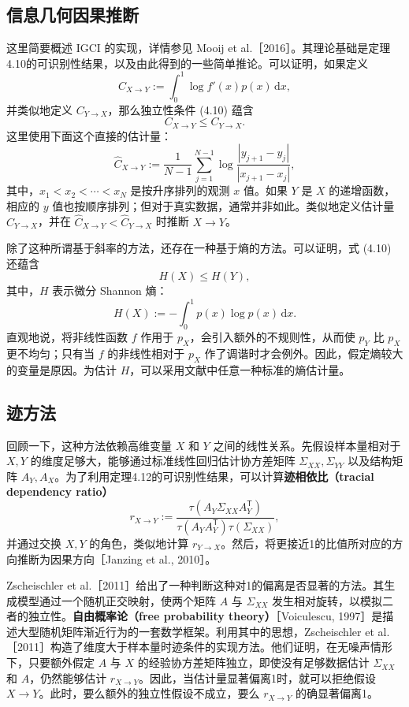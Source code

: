 \subsection{信息几何因果推断}

这里简要概述 IGCI 的实现，详情参见 Mooij et al.［2016］。其理论基础是定理4.10的可识别性结果，以及由此得到的一些简单推论。可以证明，如果定义
\[
 C_{X\to Y}:=\int_0^1\log f'(x)p(x)\,\mathrm{d}x,
\]
并类似地定义 $C_{Y\to X}$，那么独立性条件 (4.10) 蕴含
\[
 C_{X\to Y}\leq C_{Y\to X}.
\]
这里使用下面这个直接的估计量：
\[
 \widehat C_{X\to Y}:=
 \frac{1}{N-1}\sum_{j=1}^{N-1}
 \log\frac{|y_{j+1}-y_j|}{|x_{j+1}-x_j|},
\]
其中，$x_1<x_2<\cdots<x_N$ 是按升序排列的观测 $x$ 值。如果 $Y$ 是 $X$ 的递增函数，相应的 $y$ 值也按顺序排列；但对于真实数据，通常并非如此。类似地定义估计量 $\widehat C_{Y\to X}$，并在 $\widehat C_{X\to Y}<\widehat C_{Y\to X}$ 时推断 $X\to Y$。

除了这种所谓基于斜率的方法，还存在一种基于熵的方法。可以证明，式 (4.10) 还蕴含
\[
 H(X)\leq H(Y),
\]
其中，$H$ 表示微分 Shannon 熵：
\[
 H(X):=-\int_0^1p(x)\log p(x)\,\mathrm{d}x.
\]
直观地说，将非线性函数 $f$ 作用于 $p_X$，会引入额外的不规则性，从而使 $p_Y$ 比 $p_X$ 更不均匀；只有当 $f$ 的非线性相对于 $p_X$ 作了调谐时才会例外。因此，假定熵较大的变量是原因。为估计 $H$，可以采用文献中任意一种标准的熵估计量。

\subsection{迹方法}

回顾一下，这种方法依赖高维变量 $X$ 和 $Y$ 之间的线性关系。先假设样本量相对于 $X,Y$ 的维度足够大，能够通过标准线性回归估计协方差矩阵 $\Sigma_{XX},\Sigma_{YY}$ 以及结构矩阵 $A_Y,A_X$。为了利用定理4.12的可识别性结果，可以计算\textbf{迹相依比（tracial dependency ratio）}
\[
 r_{X\to Y}:=
 \frac{\tau(A_Y\Sigma_{XX}A_Y^{\mathsf T})}
 {\tau(A_YA_Y^{\mathsf T})\tau(\Sigma_{XX})},
\]
并通过交换 $X,Y$ 的角色，类似地计算 $r_{Y\to X}$。然后，将更接近1的比值所对应的方向推断为因果方向［Janzing et al., 2010］。

Zscheischler et al.［2011］给出了一种判断这种对1的偏离是否显著的方法。其生成模型通过一个随机正交映射，使两个矩阵 $A$ 与 $\Sigma_{XX}$ 发生相对旋转，以模拟二者的独立性。\textbf{自由概率论（free probability theory）}［Voiculescu, 1997］是描述大型随机矩阵渐近行为的一套数学框架。利用其中的思想，Zscheischler et al.［2011］构造了维度大于样本量时迹条件的实现方法。他们证明，在无噪声情形下，只要额外假定 $A$ 与 $X$ 的经验协方差矩阵独立，即使没有足够数据估计 $\Sigma_{XX}$ 和 $A$，仍然能够估计 $r_{X\to Y}$。因此，当估计量显著偏离1时，就可以拒绝假设 $X\to Y$。此时，要么额外的独立性假设不成立，要么 $r_{X\to Y}$ 的确显著偏离1。

